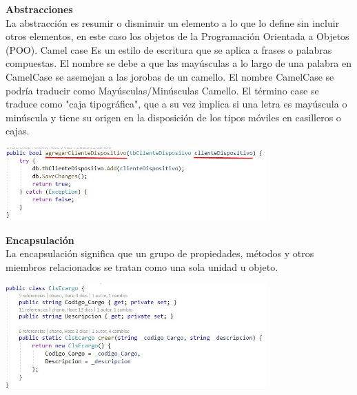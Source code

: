 \documentclass[12pt,letterpaper]{article}
\begin{document}
\textbf{Abstracciones}
\\
La abstracción es resumir o disminuir un elemento a lo que lo define sin incluir otros elementos, en este caso los objetos de la Programación Orientada a Objetos (POO).
Camel case
Es un estilo de escritura que se aplica a frases o palabras compuestas. El nombre se debe a que las mayúsculas a lo largo de una palabra en CamelCase se asemejan a las jorobas de un camello. El nombre CamelCase se podría traducir como Mayúsculas/Minúsculas Camello. El término case se traduce como "caja tipográfica", que a su vez implica si una letra es mayúscula o minúscula y tiene su origen en la disposición de los tipos móviles en casilleros o cajas.
\\
\begin{center}
	\includegraphics[width=10cm]{./img/image10.jpg} 
\end{center}

\textbf{Encapsulación}
\\
La encapsulación significa que un grupo de propiedades, métodos y otros miembros relacionados se tratan como una sola unidad u objeto.
\\
\begin{center}
	\includegraphics[width=10cm]{./img/image11.jpg} 
\end{center}
\end{document}
